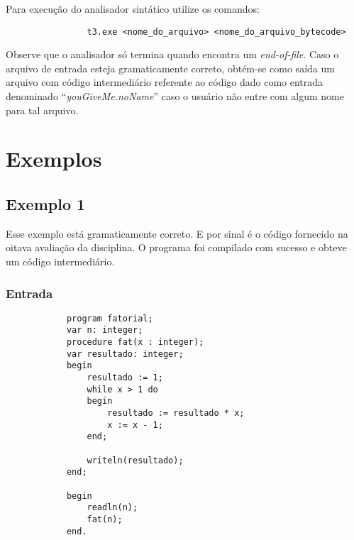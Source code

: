 \documentclass{article}
\begin{document}
	Para execução do analisador sintático utilize os comandos:

	\begin{center}
		\begin{minipage}[ht]{0.5\textwidth}
			\begin{verbatim}
				t3.exe <nome_do_arquivo> <nome_do_arquivo_bytecode>
			\end{verbatim}
		\end{minipage}
	\end{center}

	Observe que o analisador só termina quando encontra um \emph{end-of-file}. Caso o arquivo de entrada esteja gramaticamente correto, obtém-se como saída um arquivo com código intermediário referente ao código dado como entrada denominado ``\emph{youGiveMe.noName}'' caso o usuário não entre com algum nome para tal arquivo.

\section{Exemplos} %
\label{sec:exemplos}
	
	\subsection{Exemplo 1} %
	\label{sub:exemplo_1}
		Esse exemplo está gramaticamente correto. E por sinal é o código fornecido na oitava avaliação da disciplina. 
		O programa foi compilado com sucesso e obteve um código intermediário.

		\subsubsection*{Entrada} %
		\label{ssub:entrada}
		
		\begin{lstlisting}
			program fatorial;
			var n: integer;
			procedure fat(x : integer);
			var resultado: integer;
			begin
				resultado := 1;
				while x > 1 do
				begin
					resultado := resultado * x;
					x := x - 1;
				end;

				writeln(resultado);
			end;

			begin
				readln(n);
				fat(n);
			end.
		\end{lstlisting}

\end{document}
